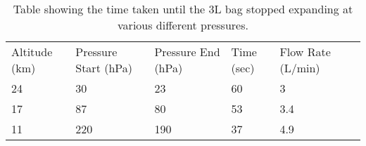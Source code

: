 \begin{table}[H]
\centering

\begin{tabular}{|l|l|l|l|l|l}
\cline{1-5}
Altitude (km) & Pressure Start (hPa) & Pressure End (hPa) & Time (sec) & Flow Rate (L/min) &  \\ \cline{1-5}
24 & 30 & 23 & 60 & 3 &  \\ \cline{1-5}
17 & 87 & 80 & 53 & 3.4 &  \\ \cline{1-5}
11 & 220 & 190 & 37 & 4.9 &  \\ \cline{1-5}
\end{tabular}
\caption{Table showing the time taken until the 3L bag stopped expanding at various different pressures.}
\label{tab:holding-times-condensation}
\end{table}

\raggedbottom